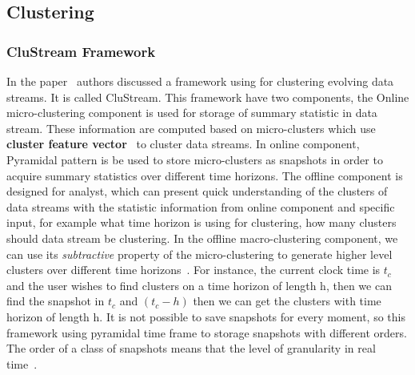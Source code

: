 \subsection{Clustering}
\subsubsection{CluStream Framework}
In the paper~\cite{aggarwal2003framework} authors discussed a framework using
for clustering evolving data streams. It is called CluStream. This framework
have two components, the Online micro-clustering component is used for storage
of summary statistic in data stream. These information are computed based on
micro-clusters which use \textbf{cluster feature vector}~\cite{zhang1996birch}
to cluster data streams. In online component, Pyramidal pattern is be used to
store micro-clusters as snapshots in order to acquire summary statistics over
different time horizons. The offline component is designed for analyst, which
can present quick understanding of the clusters of data streams with the
statistic information from online component and specific input, for example what
time horizon is using for clustering, how many clusters should data stream be
clustering. In the offline macro-clustering component, we can use its
\emph{subtractive} property of the micro-clustering to generate higher level
clusters over different time horizons~\cite{aggarwal2003framework}. For
instance, the current clock time is $t_c$ and the user wishes to find clusters
on a time horizon of length h, then we can find the snapshot in $t_c$ and $(t_c-
h)$ then we can get the clusters with time horizon of length h. It is not
possible to save snapshots for every moment, so this framework using pyramidal
time frame to storage snapshots with different orders. The order of a class of
snapshots means that the level of granularity in real
time~\cite{aggarwal2003framework}.
